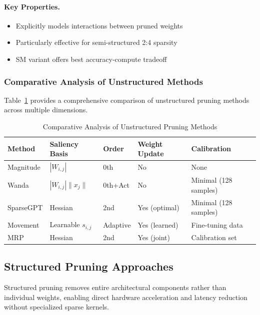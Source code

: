 \paragraph{Key Properties.}
\begin{itemize}[nosep]
	\item Explicitly models interactions between pruned weights
	\item Particularly effective for semi-structured 2:4 sparsity
	\item SM variant offers best accuracy-compute tradeoff
\end{itemize}

\subsubsection{Comparative Analysis of Unstructured Methods}

Table~\ref{tab:unstructured_comparison} provides a comprehensive comparison of unstructured pruning methods across multiple dimensions.

\begin{table}[H]
	\centering
	\caption{Comparative Analysis of Unstructured Pruning Methods}
	\label{tab:unstructured_comparison}
	\small
	\begin{tabular}{@{}p{2cm}p{1.8cm}p{1.5cm}p{1.8cm}p{2.2cm}@{}}
		\toprule
		\textbf{Method} & \textbf{Saliency Basis} & \textbf{Order} & \textbf{Weight Update} & \textbf{Calibration} \\ \midrule
		Magnitude \cite{han2015deep} & $|W_{i,j}|$ & 0th & No & None \\
		Wanda \cite{sun2023simple} & $|W_{i,j}| \|x_j\|$ & 0th+Act & No & Minimal (128 samples)  \\
		SparseGPT \cite{frantar2023sparsegpt} & Hessian & 2nd & Yes (optimal) & Minimal (128 samples)  \\
		Movement \cite{sanh2020movement} & Learnable $s_{i,j}$ & Adaptive & Yes (learned) & Fine-tuning data \\
		MRP \cite{zhao2024pruning} & Hessian & 2nd & Yes (joint) & Calibration set  \\
		\bottomrule
	\end{tabular}
\end{table}

\subsection{Structured Pruning Approaches}

Structured pruning removes entire architectural components rather than individual weights, enabling direct hardware acceleration and latency reduction without specialized sparse kernels.

